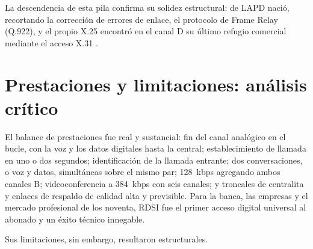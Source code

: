 \documentclass[12pt,a4paper]{article}
\begin{document}
La descendencia de esta pila confirma su solidez estructural: de LAPD nació, recortando la corrección de errores de enlace, el protocolo de Frame Relay (Q.922), y el propio X.25 encontró en el canal D su último refugio comercial mediante el acceso X.31 \cite{stallings1999, stallings2004}.

\section{Prestaciones y limitaciones: análisis crítico}

El balance de prestaciones fue real y sustancial: fin del canal analógico en el bucle, con la voz y los datos digitales hasta la central; establecimiento de llamada en uno o dos segundos; identificación de la llamada entrante; dos conversaciones, o voz y datos, simultáneas sobre el mismo par; 128~kbps agregando ambos canales B; videoconferencia a 384~kbps con seis canales; y troncales de centralita y enlaces de respaldo de calidad alta y previsible. Para la banca, las empresas y el mercado profesional de los noventa, RDSI fue el primer acceso digital universal al abonado y un éxito técnico innegable.

Sus limitaciones, sin embargo, resultaron estructurales.
\end{document}

